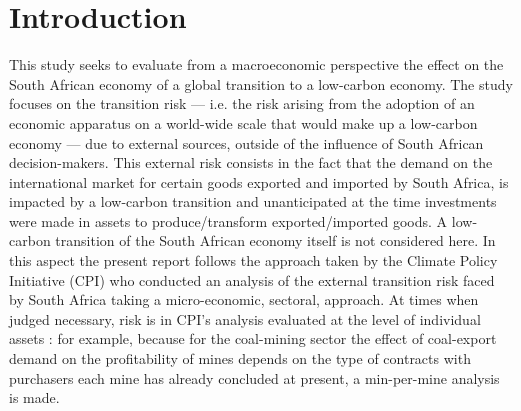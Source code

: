 \documentclass[12pt,english]{article}
\begin{document}

\newcommand{\STAB}[1]{\begin{tabular}{@{}c@{}}#1\end{tabular}}

\tableofcontents

\section{Introduction}



This study seeks to evaluate from a macroeconomic perspective the effect on the South African economy of a global transition to a low-carbon economy. The study focuses on the transition risk --- i.e. the risk arising from the adoption of an economic apparatus on a world-wide scale that would make up a low-carbon economy --- due to external sources, outside of the influence of South African decision-makers. This external risk consists in the fact that the demand on the international market for certain goods exported and imported by South Africa, %
is impacted by a low-carbon transition and unanticipated at the time investments were made in assets to produce/transform exported/imported goods. 
A low-carbon transition of the South African economy itself is not considered here. In this aspect the present report follows the approach taken by the Climate Policy Initiative (CPI) who conducted an analysis of the external transition risk faced by South Africa taking a micro-economic, sectoral, approach. At times when judged necessary, risk is in CPI's analysis evaluated at the level of individual assets : for example, because for the coal-mining sector the effect of coal-export demand on the profitability of mines depends on the type of contracts with purchasers each mine has already concluded at present, a min-per-mine analysis is made. 
\end{document}

